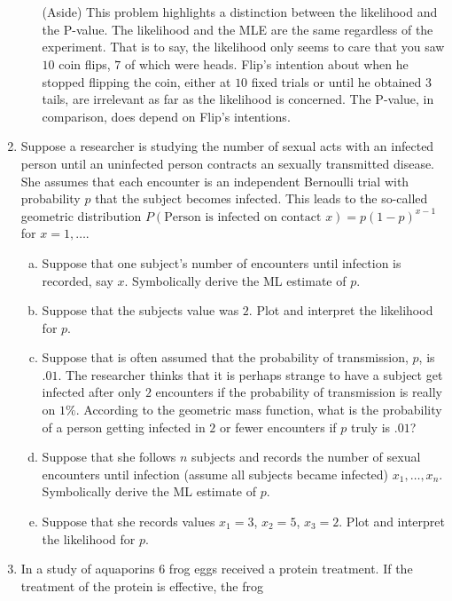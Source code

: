 \documentclass[12pt]{article}
\begin{document}
\begin{enumerate}[1.]
\begin{enumerate}[a.]
    \ \\ \ \\
    (Aside) This problem highlights a distinction between the
    likelihood and the P-value. The likelihood and the MLE are the
    same regardless of the experiment. That is to say, the likelihood
    only seems to care that you saw $10$ coin flips, $7$ of which were
    heads. Flip's intention about when he stopped flipping the coin,
    either at $10$ fixed trials or until he obtained $3$ tails, are
    irrelevant as far as the likelihood is concerned. The P-value, in
    comparison, does depend on Flip's intentions.
  \end{enumerate}
\item  Suppose a researcher is studying the number of sexual
  acts with an infected person until an uninfected person contracts an
  sexually transmitted disease. She assumes that each encounter is an
  independent Bernoulli trial with probability $p$ that the subject
  becomes infected. This leads to the so-called geometric distribution
  $P(\mbox{Person is infected on contact } x) = p(1 - p)^{x-1}$ for
  $x=1,\ldots$.
  \begin{enumerate}[a.]
  \item Suppose that one subject's number of encounters until
    infection is recorded, say $x$. Symbolically derive the ML
    estimate of $p$.
  \item Suppose that the subjects value was $2$. Plot and interpret
    the likelihood for $p$.
  \item Suppose that is often assumed that the probability of
    transmission, $p$, is $.01$. The researcher thinks that it is
    perhaps strange to have a subject get infected after only $2$
    encounters if the probability of transmission is really on
    $1\%$. According to the geometric mass function, what is the
    probability of a person getting infected in $2$ or fewer
    encounters if $p$ truly is $.01$?
  \item Suppose that she follows $n$ subjects and records the number
    of sexual encounters until infection (assume all subjects became
    infected) $x_1,\ldots,x_n$. Symbolically derive the ML
    estimate of $p$.
  \item Suppose that she records values $x_1 = 3$, $x_2 = 5$, $x_3 = 2$.
    Plot and interpret the likelihood for $p$.
  \end{enumerate}  
\item  In a study of aquaporins $6$ frog eggs received a protein
  treatment. If the treatment of the protein is effective, the frog

\end{enumerate}
\end{document}
